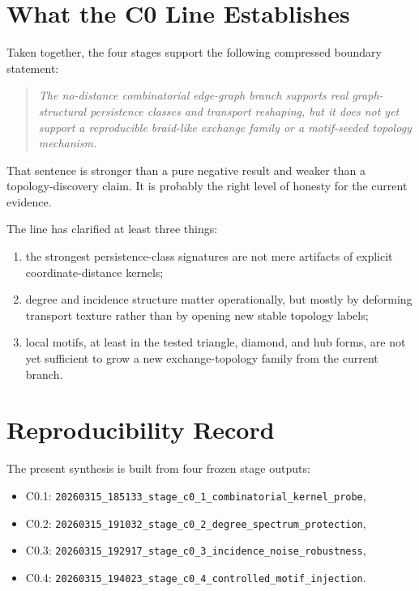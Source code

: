 \documentclass[11pt]{article}
\begin{document}
\section{What the C0 Line Establishes}

Taken together, the four stages support the following compressed boundary statement:
\begin{quote}
\emph{The no-distance combinatorial edge-graph branch supports real graph-structural persistence classes and transport reshaping, but it does not yet support a reproducible braid-like exchange family or a motif-seeded topology mechanism.}
\end{quote}

That sentence is stronger than a pure negative result and weaker than a topology-discovery claim. It is probably the right level of honesty for the current evidence.

The line has clarified at least three things:
\begin{enumerate}
\item the strongest persistence-class signatures are not mere artifacts of explicit coordinate-distance kernels;
\item degree and incidence structure matter operationally, but mostly by deforming transport texture rather than by opening new stable topology labels;
\item local motifs, at least in the tested triangle, diamond, and hub forms, are not yet sufficient to grow a new exchange-topology family from the current branch.
\end{enumerate}

\section{Reproducibility Record}

The present synthesis is built from four frozen stage outputs:
\begin{itemize}
\item C0.1: \texttt{20260315\_185133\_stage\_c0\_1\_combinatorial\_kernel\_probe},
\item C0.2: \texttt{20260315\_191032\_stage\_c0\_2\_degree\_spectrum\_protection},
\item C0.3: \texttt{20260315\_192917\_stage\_c0\_3\_incidence\_noise\_robustness},
\item C0.4: \texttt{20260315\_194023\_stage\_c0\_4\_controlled\_motif\_injection}.
\end{itemize}
\end{document}
